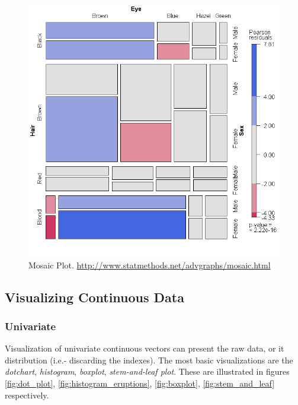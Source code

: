 \documentclass[12pt,a4paper]{report}
\theoremstyle{plain}
\theoremstyle{definition}
\begin{document}
\begin{figure}[h]
\centering
\includegraphics[height=0.3\textheight]{art/mosaic1}
\caption[Mosaic Plot]{Mosaic Plot. \newline
\url{http://www.statmethods.net/advgraphs/mosaic.html}}
\label{fig:mosaic}
\end{figure}







\afterpage{\clearpage}


\subsection{Visualizing Continuous Data}




\subsubsection{Univariate}
Visualization of univariate continuous vectors can present the raw data, or it distribution (i.e.- discarding the indexes).
The most basic visualizations are the \emph{dotchart}, \emph{histogram}, \emph{boxplot}, \emph{stem-and-leaf plot}. 
These are illustrated in figures \ref{fig:dot_plot}, \ref{fig:histogram_eruptions}, \ref{fig:boxplot}, \ref{fig:stem_and_leaf} respectively. 
\end{document}
